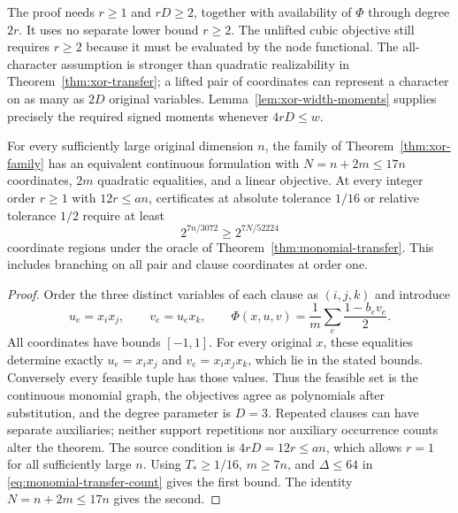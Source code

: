 The proof needs $r\ge1$ and $rD\ge2$, together with availability of
$\Phi$ through degree $2r$. It uses no separate lower bound $r\ge2$.
The unlifted cubic objective still requires $r\ge2$ because it must be
evaluated by the node functional. The all-character assumption is stronger
than quadratic realizability in Theorem~\ref{thm:xor-transfer}; a lifted
pair of coordinates can represent a character on as many as $2D$ original
variables. Lemma~\ref{lem:xor-width-moments} supplies precisely the required
signed moments whenever $4rD\le w$.

\begin{corollary}
\label{cor:xor-quadratic-formulation}
For every sufficiently large original dimension $n$, the family of
Theorem~\ref{thm:xor-family} has an equivalent continuous formulation
with $N=n+2m\le17n$ coordinates, $2m$ quadratic equalities, and a linear
objective. At every integer order $r\ge1$ with $12r\le an$, certificates
at absolute tolerance $1/16$ or relative tolerance $1/2$ require at least
\begin{equation}\label{eq:quadratic-formulation-count}
 2^{7n/3072}\ge2^{7N/52224}
\end{equation}
coordinate regions under the oracle of Theorem~\ref{thm:monomial-transfer}.
This includes branching on all pair and clause coordinates at order one.
\end{corollary}
\begin{proof}
Order the three distinct variables of each clause as $(i,j,k)$ and introduce
\begin{equation}\label{eq:xor-factorable-formulation}
 u_e=x_ix_j,\qquad v_e=u_ex_k,\qquad
 \Phi(x,u,v)=\frac1m\sum_e\frac{1-b_ev_e}{2}.
\end{equation}
All coordinates have bounds $[-1,1]$. For every original $x$, these
equalities determine exactly $u_e=x_ix_j$ and $v_e=x_ix_jx_k$, which lie
in the stated bounds. Conversely every feasible tuple has those values.
Thus the feasible set is the continuous monomial graph, the objectives
agree as polynomials after substitution, and the degree parameter is
$D=3$. Repeated clauses can have separate auxiliaries; neither support
repetitions nor auxiliary occurrence counts alter the theorem. The source
condition is $4rD=12r\le an$, which allows $r=1$ for all sufficiently
large $n$. Using $T_*\ge1/16$, $m\ge7n$, and $\Delta\le64$ in
\eqref{eq:monomial-transfer-count} gives the first bound. The identity
$N=n+2m\le17n$ gives the second.
\end{proof}

